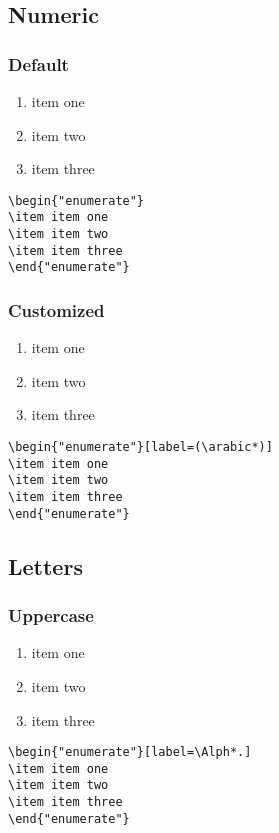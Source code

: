 \documentclass[12pt, letterpaper]{article}
\begin{document}
\subsection{Numeric} 
\subsubsection{Default} 
\begin{enumerate}
	\item item one 
	\item item two
	\item item three
\end{enumerate}
\begin{lstlisting}
\begin{"enumerate"}
\item item one 
\item item two
\item item three
\end{"enumerate"}
\end{lstlisting}


\subsubsection{Customized}
\begin{enumerate}[label=(\arabic*)]
		\item item one 
		\item item two
		\item item three
\end{enumerate}
\begin{lstlisting}
\begin{"enumerate"}[label=(\arabic*)]
\item item one 
\item item two
\item item three
\end{"enumerate"}
\end{lstlisting}


\subsection{Letters}

\subsubsection{Uppercase}
\begin{enumerate}[label=\Alph*.]
	\item item one 
	\item item two
	\item item three
\end{enumerate}
\begin{lstlisting}
\begin{"enumerate"}[label=\Alph*.]
\item item one 
\item item two
\item item three
\end{"enumerate"}
\end{lstlisting}
\end{document}
